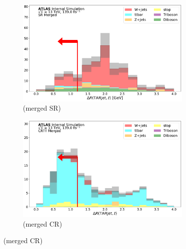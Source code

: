     \begin{figure}[htbp]\ContinuedFloat
  \begin{subfigure}{0.45\textwidth}
     \includegraphics[width = 0.95\textwidth]{Figures/App_SR_CR_distributions/SR1L_Merged/dR_lep_TARJets10_N_1.pdf}
    \caption{\drTARl (merged SR)}
     \end{subfigure}
    \begin{subfigure}{0.45\textwidth}
     \includegraphics[width = 0.95\textwidth]{Figures/App_SR_CR_distributions/CRTT_Merged/dR_lep_TARJets10_N_1.pdf}
     \caption{\drTARl (merged \ttbar CR)}
     \end{subfigure}


\end{figure}
